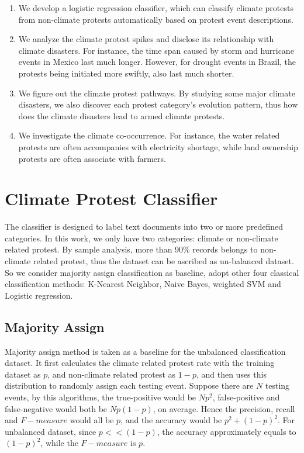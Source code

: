 \begin{enumerate}
  \item We develop a logistic regression classifier, which can classify climate protests from non-climate protests automatically based on protest event descriptions.
  \item We analyze the climate protest spikes and disclose its relationship with climate disasters. For instance, the time span caused by storm and hurricane events in Mexico last much longer. However, for drought events in Brazil, the protests being initiated more swiftly, also last much shorter.
  \item We figure out the climate protest pathways. By studying some major climate disasters, we also discover each protest category's evolution pattern, thus how does the climate disasters lead to armed climate protests.
  \item We investigate the climate co-occurrence. For instance, the water related protests are often accompanies with electricity shortage, while land ownership protests are often associate with farmers.
\end{enumerate}
%

\section{Climate Protest Classifier}
The classifier is designed to label text documents into two or more predefined categories. In this work, we only have two categories: climate or non-climate related protest. By sample analysis, more than 90\% records belongs to non-climate related protest, thus the dataset can be ascribed as un-balanced dataset. So we consider majority assign classification as baseline, adopt other four classical classification methods: K-Nearest Neighbor, Naive Bayes, weighted SVM and Logistic regression.

\subsection{Majority Assign}
Majority assign method is taken as a baseline for the unbalanced classification dataset. It first calculates the climate related protest rate with the training dataset as $p$, and non-climate related protest as $1-p$, and then uses this distribution to randomly assign each testing event. Suppose there are $N$ testing events, by this algorithms, the true-positive would be $Np^2$, false-positive and false-negative would both be $Np(1-p)$, on average. Hence the precision, recall and $F-measure$ would all be $p$, and the accuracy would be $p^2+(1-p)^2$. For unbalanced dataset, since $p<<(1-p)$, the accuracy approximately equals to $(1-p)^2$, while the $F-measure$ is $p$.

